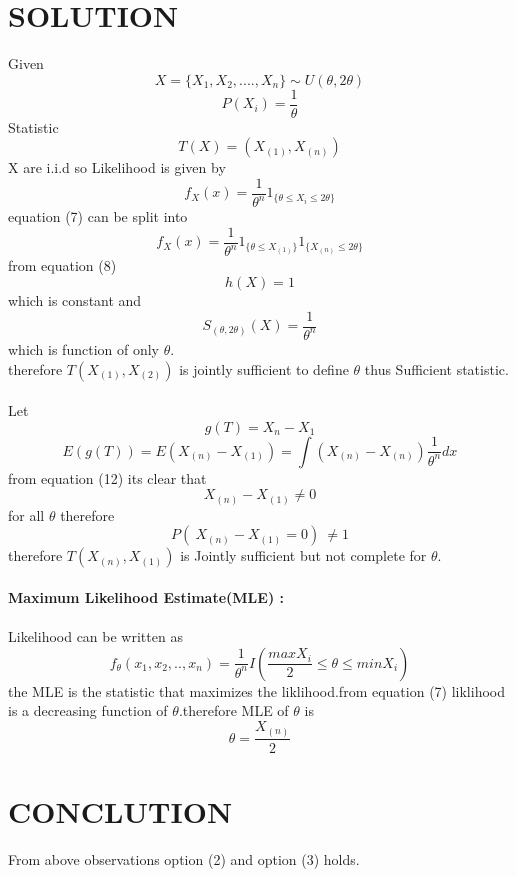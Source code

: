 \documentclass[journal,12pt,twocolumn]{IEEEtran}
\begin{document}
\section{\textbf{SOLUTION}}
Given
\begin{equation}
    X=\{X_1,X_2,....,X_n\}\sim U(\theta,2\theta)
\end{equation}
\begin{equation}
    P(X_i)=\dfrac{1}{\theta}
\end{equation}
Statistic
\begin{equation}
    T(X)=(X_{(1)},X_{(n)})
\end{equation}
X are i.i.d so Likelihood is given by 
\begin{equation}
    f_X(x)=\frac{1}{\theta^n}1_{\{\theta\leq X_i \leq2\theta\}}
\end{equation}
equation (7) can be split into
\begin{equation}
    f_X(x)=\frac{1}{\theta^n}1_{\{\theta\leq X_{(1)}\}}1_{\{ X_{(n)}\leq2\theta\}}
\end{equation}
from equation (8) 
\begin{equation}
    h(X)=1
\end{equation}
 which is constant and
\begin{equation}
    S_{(\theta,2\theta)}(X)=\frac{1}{\theta^n}
\end{equation}
 which is function of only $\theta$.\\
therefore $T(X_{(1)},X_{(2)})$ is jointly sufficient to define $\theta$ thus Sufficient statistic.\\ \\
Let 
\begin{equation}
     g(T)=X_n-X_1
\end{equation}
\begin{equation}
    E(g(T))=E(X_{(n)}-X_{(1)})=\int (X_{(n)}-X_{(n)})\frac{1}{\theta^n}dx
\end{equation}
from equation (12) its clear that
\begin{equation}
    X_{(n)}-X_{(1)}\neq0
\end{equation}
for all $\theta$ therefore 
\begin{equation}
    P(\ X_{(n)}-X_{(1)}=0 )\ \neq1
\end{equation}
therefore $T(X_{(n)},X_{(1)})$ is Jointly sufficient but not complete for $\theta$. \\ \\
\textbf{Maximum Likelihood Estimate(MLE) :}\\ \\
Likelihood can be written as 
\begin{equation}
    f_\theta(x_1,x_2,..,x_n)=\frac{1}{\theta^n}I(\frac{max     X_i}{2}\leq\theta\leq min X_i)
\end{equation}
the MLE is the statistic that maximizes the liklihood.from equation (7) liklihood is a decreasing function of $\theta$.therefore MLE of $\theta$ is 
\begin{equation}
    \theta=\frac{X_{(n)}}{2}
\end{equation}
\section{\textbf{CONCLUTION}}
From above observations option (2) and option (3) holds.
\end{document}
